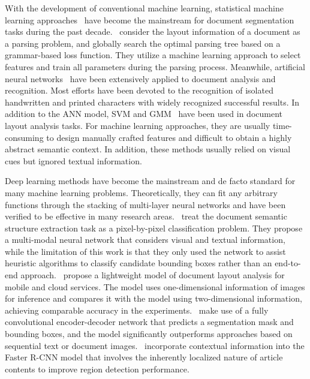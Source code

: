 \documentclass{article} \usepackage{iclr2021_conference,times}
\begin{document}
With the development of conventional machine learning, statistical machine learning approaches~\citep{shilman2005learning,1359749} have become the mainstream for document segmentation tasks during the past decade.~\cite{shilman2005learning} consider the layout information of a document as a parsing problem, and globally search the optimal parsing tree based on a grammar-based loss function. They utilize a machine learning approach to select features and train all parameters during the parsing process. Meanwhile, artificial neural networks~\citep{1359749} have been extensively applied to document analysis and recognition. Most efforts have been devoted to the recognition of isolated handwritten and printed characters with widely recognized successful results. In addition to the ANN model, SVM and GMM~\citep{6628808} have been used in document layout analysis tasks. For machine learning approaches, they are usually time-consuming to design manually crafted features and difficult to obtain a highly abstract semantic context. In addition, these methods usually relied on visual cues but ignored textual information.



Deep learning methods have become the mainstream and de facto standard for many machine learning problems. Theoretically, they can fit any arbitrary functions through the stacking of multi-layer neural networks and have been verified to be effective in many research areas.~\cite{Yang2017LearningTE} treat the document semantic structure extraction task as a pixel-by-pixel classification problem. They propose a multi-modal neural network that considers visual and textual information, while the limitation of this work is that they only used the network to assist heuristic algorithms to classify candidate bounding boxes rather than an end-to-end approach.~\cite{Viana2017FastCD} propose a lightweight model of document layout analysis for mobile and cloud services. The model uses one-dimensional information of images for inference and compares it with the model using two-dimensional information, achieving comparable accuracy in the experiments.~\cite{katti-etal-2018-chargrid} make use of a fully convolutional encoder-decoder network that predicts a segmentation mask and bounding boxes, and the model significantly outperforms approaches based on sequential text or document images.~\cite{soto-yoo-2019-visual} incorporate contextual information into the Faster R-CNN model that involves the inherently localized nature of article contents to improve region detection performance.
\end{document}
